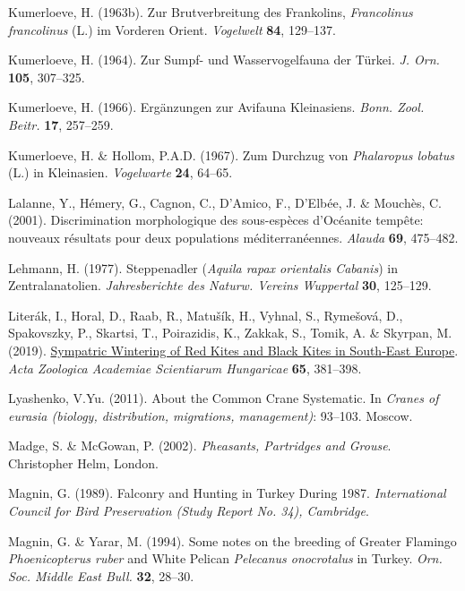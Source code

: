 \documentclass[
  a4paper,
  DIV=11,
  numbers=noendperiod]{scrreprt}
\newlength{\cslhangindent}
\newenvironment{CSLReferences}[2] %
 {\begin{list}{}{%
  \setlength{\itemindent}{0pt}
  \setlength{\leftmargin}{0pt}
  \setlength{\parsep}{0pt}
  \ifodd #1
   \setlength{\leftmargin}{\cslhangindent}
   \setlength{\itemindent}{-1\cslhangindent}
  \fi
  \setlength{\itemsep}{#2\baselineskip}}}
 {\end{list}}
\begin{document}
\begin{CSLReferences}{1}{1}
Kumerloeve, H. (1963b). {Zur Brutverbreitung des Frankolins,
\emph{Francolinus francolinus} (L.) im Vorderen Orient}.
\emph{Vogelwelt} \textbf{84}, 129--137.

Kumerloeve, H. (1964). {Zur Sumpf- und Wasservogelfauna der Türkei}.
\emph{J. Orn.} \textbf{105}, 307--325.

Kumerloeve, H. (1966). {Ergänzungen zur Avifauna Kleinasiens}.
\emph{Bonn. Zool. Beitr.} \textbf{17}, 257--259.

Kumerloeve, H. \& Hollom, P.A.D. (1967). {Zum Durchzug von
\emph{Phalaropus lobatus} (L.) in Kleinasien}. \emph{Vogelwarte}
\textbf{24}, 64--65.

Lalanne, Y., Hémery, G., Cagnon, C., D'Amico, F., D'Elbée, J. \&
Mouchès, C. (2001). {Discrimination morphologique des sous-espèces
d'Océanite tempête: nouveaux résultats pour deux populations
méditerranéennes}. \emph{Alauda} \textbf{69}, 475--482.

Lehmann, H. (1977). {Steppenadler (\emph{Aquila rapax orientalis
Cabanis}) in Zentralanatolien}. \emph{Jahresberichte des Naturw. Vereins
Wuppertal} \textbf{30}, 125--129.

Literák, I., Horal, D., Raab, R., Matušík, H., Vyhnal, S., Rymešová, D.,
Spakovszky, P., Skartsi, T., Poirazidis, K., Zakkak, S., Tomik, A. \&
Skyrpan, M. (2019).
\href{https://doi.org/10.17109/AZH.65.4.381.2019}{{Sympatric Wintering
of Red Kites and Black Kites in South-East Europe}}. \emph{Acta
Zoologica Academiae Scientiarum Hungaricae} \textbf{65}, 381--398.

Lyashenko, V.Yu. (2011). {About the Common Crane Systematic}. In
\emph{Cranes of eurasia (biology, distribution, migrations,
management)}: 93--103. Moscow.

Madge, S. \& McGowan, P. (2002). \emph{{Pheasants, Partridges and
Grouse}}. Christopher Helm, London.

Magnin, G. (1989). {Falconry and Hunting in Turkey During 1987}.
\emph{International Council for Bird Preservation (Study Report No. 34),
Cambridge}.

Magnin, G. \& Yarar, M. (1994). {Some notes on the breeding of Greater
Flamingo \emph{Phoenicopterus ruber} and White Pelican \emph{Pelecanus
onocrotalus} in Turkey}. \emph{Orn. Soc. Middle East Bull.} \textbf{32},
28--30.


\end{CSLReferences}
\end{document}

